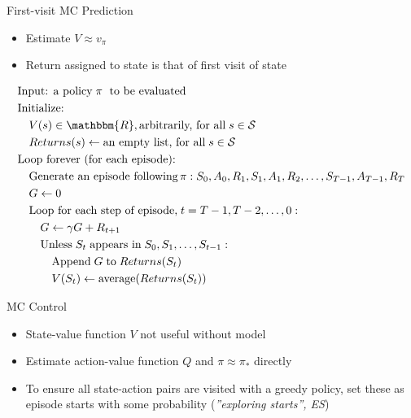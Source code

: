 \documentclass[ignorenonframetext,xcolor=x11names]{beamer}
\begin{document}
\begin{frame}[label=full]{First-visit MC Prediction}
\begin{itemize}
   \item Estimate $V \approx v_{\pi}$
   \item Return assigned to state is that of first visit of state
\end{itemize}

\begin{block}{}
\footnotesize
\begin{align*}
& \text{Input: a policy}\;\pi\;\text{ to be evaluated} \\
& \text{Initialize:} \\
& \quad V(s) \in \mathbbm{R}, \text{arbitrarily, for all}\;s \in \mathcal{S} \\
& \quad Returns(s) \leftarrow \text{an empty list, for all}\; s \in \mathcal{S} \\
& \text{Loop forever (for each episode):}\\
& \quad \text{Generate an episode following}\, \pi: S_0, A_0, R_1, S_1, A_1, R_2, \ldots, S_{T-1}, A_{T-1}, R_{T} \\
& \quad G \leftarrow 0 \\
& \quad \text{Loop for each step of episode,}\; t = T-1, T-2, \ldots, 0: \\
& \quad \quad G \leftarrow \gamma G + R_{t+1} \\
& \quad \quad \text{Unless}\; S_t\; \text{appears in}\; S_0, S_1, \ldots, S_{t-1}: \\
& \quad \quad \quad \text{Append}\; G\; \text{to}\; Returns(S_t) \\
& \quad \quad \quad V(S_t) \leftarrow \operatorname{average}(Returns(S_t))
\end{align*}
\end{block}
\end{frame}

\begin{frame}[label=full]{MC Control}
\begin{itemize}
   \item State-value function $V$ not useful without model
   \item Estimate action-value function $Q$ and $\pi \approx \pi_*$ directly
   \item To ensure all state-action pairs are visited with a greedy policy, set these as episode starts with some probability (\emph{''exploring starts'', ES})
\end{itemize}
\end{frame}
\end{document}
